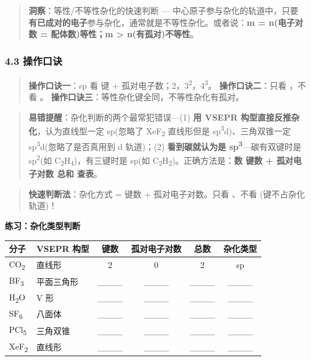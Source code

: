 \begin{quote}
\textbf{洞察}：等性/不等性杂化的快速判断 --- 中心原子参与杂化的轨道中，只要\textbf{有已成对的电子}参与杂化，通常就是不等性杂化。或者说：\textbf{m = n(电子对数 = 配体数)\箭 等性；m \textgreater{} n(有孤对)\箭 不等性}。
\end{quote}

\subsubsection{4.3 操作口诀}\label{ux64cdux4f5cux53e3ux8bc0}

\begin{quote}
\textbf{操作口诀一}：sp 看  键 + 孤对电子数；2，3\textsuperscript{2}，4\textsuperscript{3}。
\textbf{操作口诀二}：只看 ，不看 \派。
\textbf{操作口诀三}：等性杂化键全同，不等性杂化有孤对。
\end{quote}

\begin{quote}
\textbf{易错提醒}：杂化判断的两个最常犯错误---(1) \textbf{用 VSEPR 构型直接反推杂化}，认为直线型一定 sp(忽略了 XeF\textsubscript{2} 直线形但是 sp\textsuperscript{3}d)、三角双锥一定 sp\textsuperscript{3}d(忽略了是否真用到 d 轨道)；(2) \textbf{看到碳就认为是 sp\textsuperscript{3}}---碳有双键时是 sp\textsuperscript{2}(如 C\textsubscript{2}H\textsubscript{4})，有三键时是 sp(如 C\textsubscript{2}H\textsubscript{2})。正确方法是：\textbf{数  键数 + 孤对电子对数 \箭 总和 \箭 查表}。
\end{quote}

\begin{quote}
\textbf{快速判断法}：杂化方式 =  键数 + 孤对电子对数。只看 、不看 \派(\派 键不占杂化轨道)！
\end{quote}

\textbf{练习：杂化类型判断}

{\def\LTcaptype{none} %
\begin{longtable}[]{@{}llcccc@{}}
\toprule\noalign{}
分子 & VSEPR 构型 &  键数 & 孤对电子对数 & 总数 & 杂化类型 \\
\midrule\noalign{}
\endhead
\bottomrule\noalign{}
\endlastfoot
CO\textsubscript{2} & 直线形 & 2 & 0 & 2 & sp \\
BF\textsubscript{3} & 平面三角形 & \_\_\_\_ & \_\_\_\_ & \_\_\_\_ & \_\_\_\_ \\
H\textsubscript{2}O & V 形 & \_\_\_\_ & \_\_\_\_ & \_\_\_\_ & \_\_\_\_ \\
SF\textsubscript{6} & 八面体 & \_\_\_\_ & \_\_\_\_ & \_\_\_\_ & \_\_\_\_ \\
PCl\textsubscript{5} & 三角双锥 & \_\_\_\_ & \_\_\_\_ & \_\_\_\_ & \_\_\_\_ \\
XeF\textsubscript{2} & 直线形 & \_\_\_\_ & \_\_\_\_ & \_\_\_\_ & \_\_\_\_ \\
\end{longtable}
}

